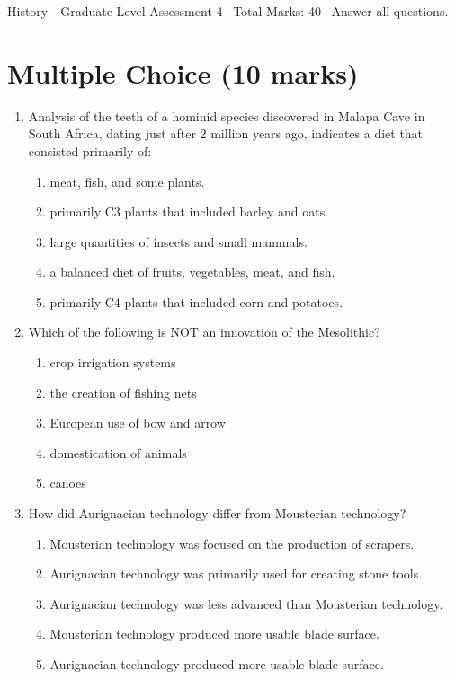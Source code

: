\documentclass[12pt]{article}
\begin{document}
\begin{center}
History - Graduate Level Assessment 4 \
Total Marks: 40 \
Answer all questions.
\end{center}

\section*{Multiple Choice (10 marks)}
\begin{enumerate}[label=\arabic*.]
\item Analysis of the teeth of a hominid species discovered in Malapa Cave in South Africa,
dating just after 2 million years ago, indicates a diet that consisted primarily of:
\begin{enumerate}[label=(\alph*)]
    \item meat, fish, and some plants.
    \item primarily C3 plants that included barley and oats.
    \item large quantities of insects and small mammals.
    \item a balanced diet of fruits, vegetables, meat, and fish.
    \item primarily C4 plants that included corn and potatoes.
\end{enumerate}
\item Which of the following is NOT an innovation of the Mesolithic?
\begin{enumerate}[label=(\alph*)]
    \item crop irrigation systems
    \item the creation of fishing nets
    \item European use of bow and arrow
    \item domestication of animals
    \item canoes
\end{enumerate}
\item How did Aurignacian technology differ from Mousterian technology?
\begin{enumerate}[label=(\alph*)]
    \item Mousterian technology was focused on the production of scrapers.
    \item Aurignacian technology was primarily used for creating stone tools.
    \item Aurignacian technology was less advanced than Mousterian technology.
    \item Mousterian technology produced more usable blade surface.
    \item Aurignacian technology produced more usable blade surface.

\end{enumerate}
\end{enumerate}
\end{document}
